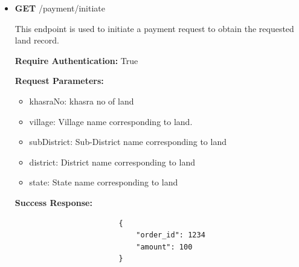 \documentclass{article}
\begin{document}
\begin{itemize}
            \item \textbf{GET}  /payment/initiate
                \begin{addmargin}[1em]{2em}%
                    This endpoint is used to initiate a payment request to obtain the requested land record.
                    \par\textbf{Require Authentication:} True
                    \par\textbf{Request Parameters:}
                    \begin{itemize}
                        \item khasraNo: khasra no of land
                        \item village: Village name corresponding to land.
                        \item subDistrict: Sub-District name corresponding to land
                        \item district: District name corresponding to land
                        \item state: State name corresponding to land
                    \end{itemize}
                    \par\textbf{Success Response:}
                    \begin{listing}[H]
                    \begin{verbatim}
                        {   
                            "order_id": 1234
                            "amount": 100
                        }
                    \end{verbatim}
                   \end{listing}
                \end{addmargin}


\end{itemize}
\end{document}
